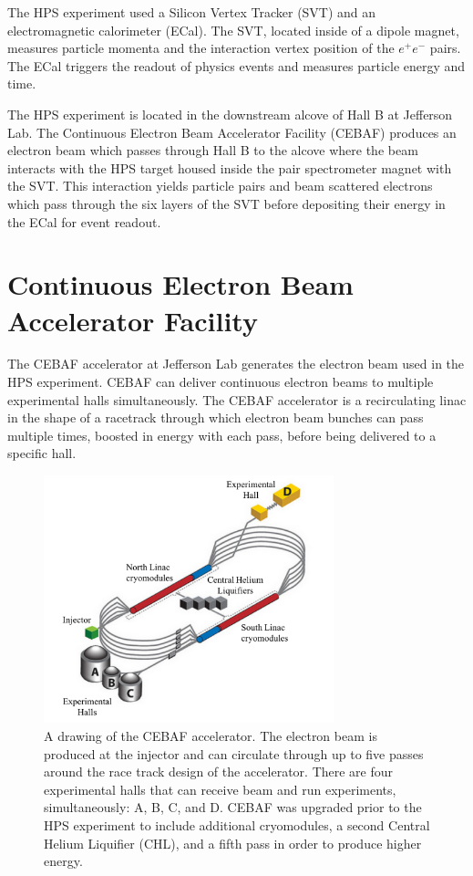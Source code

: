 The HPS experiment used a Silicon Vertex Tracker (SVT) and an electromagnetic calorimeter (ECal). The SVT, located inside of a dipole magnet, measures particle momenta and the interaction vertex position of the $e^+e^-$ pairs. The ECal triggers the readout of physics events and measures particle energy and time. \par
The HPS experiment is located in the downstream alcove of Hall B at Jefferson Lab. The Continuous Electron Beam Accelerator Facility (CEBAF) produces an electron beam which passes through Hall B to the alcove where the beam interacts with the HPS target housed inside the pair spectrometer magnet with the SVT. This interaction yields particle pairs and beam scattered electrons which pass through the six layers of the SVT before depositing their energy in the ECal for event readout.

\section{Continuous Electron Beam Accelerator Facility}

The CEBAF accelerator at Jefferson Lab generates the electron beam used in the HPS experiment. CEBAF can deliver continuous electron beams to multiple experimental halls simultaneously. The CEBAF accelerator is a recirculating linac in the shape of a racetrack through which electron beam bunches can pass multiple times, boosted in energy with each pass, before being delivered to a specific hall. 

\begin{figure}[htb]
  \centering
      \includegraphics[width=0.75\textwidth]{pics/experiment/cebafLabel.png}
  \caption[CEBAF accelerator]{A drawing of the CEBAF accelerator. The electron beam is produced at the injector and can circulate through up to five passes around the race track design of the accelerator. There are four experimental halls that can receive beam and run experiments, simultaneously: A, B, C, and D. CEBAF was upgraded prior to the HPS experiment to include additional cryomodules, a second Central Helium Liquifier (CHL), and a fifth pass in order to produce higher energy.}
  \label{Figure:cebaf}
\end{figure}

